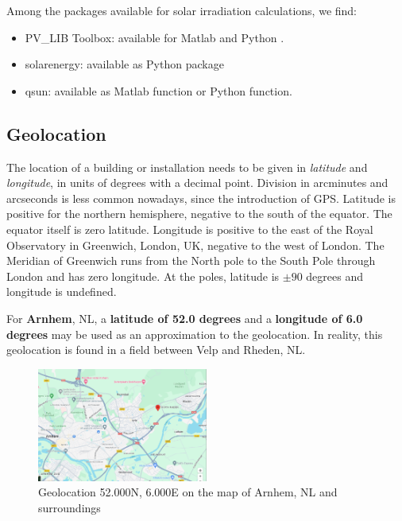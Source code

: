Among the packages available for solar irradiation calculations, we find:

\begin{itemize}
	\item \textsf{PV\_LIB Toolbox}: available for Matlab and Python \cite{PV_LIB_main, PV_LIB_Python, PV_LIB_ReadTheDocs, PV_LIB_GitHub}.
	\item \textsf{solarenergy}: available as Python package \cite{SolarEnergy_ReadTheDocs, SolarEnergy_GitHub}
	\item \textsf{qsun}: available as Matlab function or Python function.
\end{itemize}

\subsection{Geolocation}

The location of a building or installation needs to be given in \emph{latitude} and \emph{longitude}, in units of degrees with a decimal point. Division in arcminutes and arcseconds is less common nowadays, since the introduction of GPS. Latitude is positive for the northern hemisphere, negative to the south of the equator. The equator itself is zero latitude. Longitude is positive to the east of the Royal Observatory in Greenwich, London, UK, negative to the west of London. The Meridian of Greenwich runs from the North pole to the South Pole through London and has zero longitude. At the poles, latitude is $\pm 90$ degrees and longitude is undefined.

For \textbf{Arnhem}, NL, a \textbf{latitude of 52.0 degrees} and a \textbf{longitude of 6.0 degrees} may be used as an approximation to the geolocation. In reality, this geolocation is found in a field between Velp and Rheden, NL.

\begin{figure}[H]
	\centering
	\includegraphics[width=0.5\textwidth]{Figures/52.0N6.0E.png}
	\caption{Geolocation 52.000N, 6.000E on the map of Arnhem, NL and surroundings}
	\label{fig:52N6E}
\end{figure}

